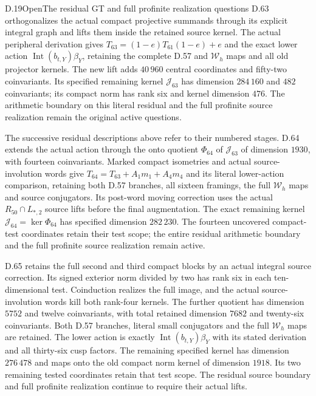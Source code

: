 \begin{statement}{D.19}{Open}{The residual GT and full profinite realization questions}
D.63 orthogonalizes the actual compact projective summands
through its explicit integral graph and lifts them inside the
retained source kernel. The actual peripheral derivation gives
$T_{63}=(1-e)T_{61}(1-e)+e$ and the exact lower action
$\operatorname{Int}(b_{t,Y})\beta_Y$, retaining the complete
D.57 and $\mathcal W_h$ maps and all old projector kernels.
The new lift adds $40\,960$ central coordinates and fifty-two
coinvariants. Its specified remaining kernel $\mathcal J_{63}$
has dimension $284\,160$ and $482$ coinvariants; its compact
norm has rank six and kernel dimension $476$.
The arithmetic boundary on this literal residual and the
full profinite source realization remain the original active
questions.

The successive residual descriptions above refer to their
numbered stages. D.64 extends the actual action through the
onto quotient $\Phi_{64}$ of $\mathcal J_{63}$ of dimension
$1930$, with fourteen coinvariants. Marked compact isometries
and actual source-involution words give
$T_{64}=T_{63}+A_1m_1+A_4m_4$ and its literal lower-action
comparison, retaining both D.57 branches, all sixteen framings,
the full $\mathcal W_h$ maps and source conjugators.
Its post-word moving correction uses the actual
$R_{50}\cap L_{*,2}$ source lifts before the final augmentation.
The exact remaining kernel $\mathcal J_{64}=\ker\Phi_{64}$
has specified dimension $282\,230$.
The fourteen uncovered compact-test coordinates retain
their test scope; the entire residual arithmetic boundary
and the full profinite source realization remain active.

D.65 retains the full second and third compact blocks by an actual
integral source correction. Its signed exterior norm divided by two
has rank six in each ten-dimensional test. Coinduction realizes the
full image, and the actual source-involution words kill both rank-four
kernels. The further quotient has dimension $5752$ and twelve
coinvariants, with total retained dimension $7682$ and twenty-six
coinvariants. Both D.57 branches, literal small conjugators and the
full $\mathcal W_h$ maps are retained. The lower action is exactly
$\operatorname{Int}(b_{t,Y})\beta_Y$ with its stated derivation and
all thirty-six cusp factors. The remaining specified kernel has
dimension $276\,478$ and maps onto the old compact norm kernel of
dimension $1918$. Its two remaining tested coordinates retain that
test scope. The residual source boundary and full profinite
realization continue to require their actual lifts.
\end{statement}
